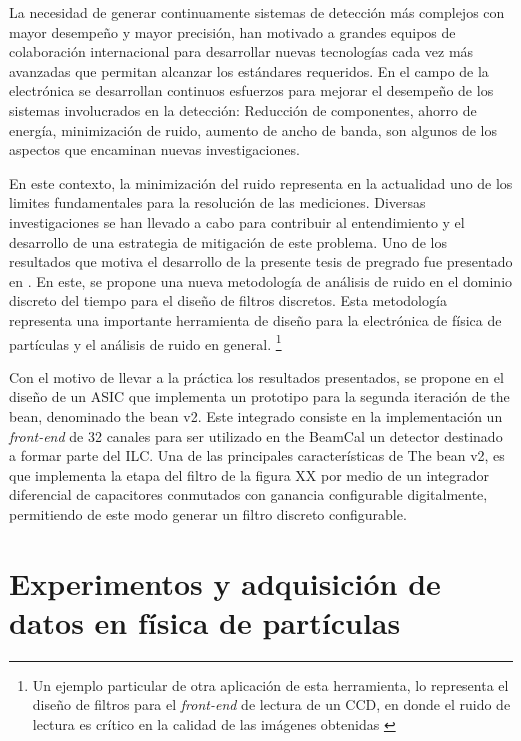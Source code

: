 	La necesidad de generar continuamente sistemas de detección más complejos con mayor desempeño y mayor precisión, han motivado a grandes equipos de colaboración internacional para desarrollar nuevas tecnologías cada vez más avanzadas que permitan alcanzar los estándares requeridos. En el campo de la electrónica se desarrollan continuos esfuerzos para mejorar el desempeño de los sistemas involucrados en la detección: Reducción de componentes, ahorro de energía, minimización de ruido, aumento de ancho de banda, son algunos de los aspectos que encaminan nuevas investigaciones.
	
	
	En este contexto, la minimización del ruido representa en la actualidad uno de los limites fundamentales para la resolución de las mediciones. Diversas investigaciones se han llevado a cabo para contribuir al entendimiento y el desarrollo de una estrategia de mitigación de este problema. Uno de los resultados que motiva el desarrollo de la presente tesis de pregrado fue presentado en \citep{avila101}. En este, se propone una nueva metodología de análisis de ruido  en el dominio discreto del tiempo para el diseño de filtros discretos. Esta metodología representa una importante herramienta de diseño para la electrónica de física de partículas y el análisis de ruido en general. \footnote{Un ejemplo particular de otra aplicación de esta herramienta,  lo representa el diseño de filtros para el \textit{front-end} de lectura de un CCD, en donde el ruido de lectura es crítico en la calidad de las imágenes obtenidas \citep{guzman101}}

	Con el motivo de llevar a la práctica los resultados presentados, se propone en \citep{diegothesis} el diseño de un ASIC que implementa un prototipo para la segunda iteración de the bean, denominado the bean v2. Este integrado consiste en la implementación un \textit{front-end} de 32 canales para ser utilizado en the BeamCal un detector destinado a formar parte del ILC. Una de las principales características de The bean v2, es que implementa la etapa del filtro de la figura XX por medio de un integrador diferencial de capacitores conmutados con ganancia configurable digitalmente, permitiendo de este modo generar un filtro discreto configurable.
 

\section{Experimentos y adquisición de datos en física de partículas}

